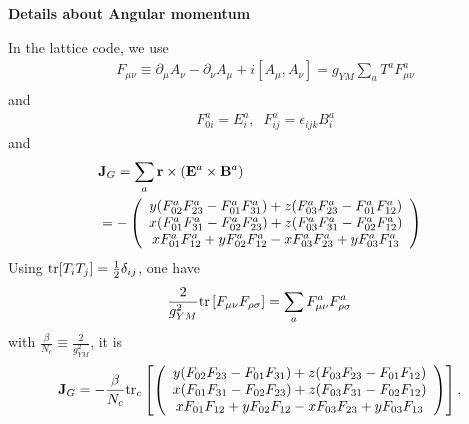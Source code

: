 \textbf{Details about Angular momentum}

In the lattice code, we use
\begin{equation}
\begin{split}
&F_{\mu\nu}\equiv \partial _{\mu}A_{\nu}-\partial _{\nu}A_{\mu}+i[A_{\mu},A_{\nu}]=g_{YM}\sum _aT^a F^a_{\mu\nu}\\
\end{split}
\end{equation}
and
\begin{equation}
\begin{split}
&F^a_{0i}=E^a_i,\;\;F^a_{ij}=\epsilon _{ijk}B^a_i
\end{split}
\end{equation}
and
\begin{equation}
\begin{split}
&{\bf J}_G=\sum _a {\bf r}\times \left({\bf E}^a\times {\bf B}^a\right)\\
&=-\left(\begin{array}{c}
y(F^a_{02}F^a_{23}-F^a_{01}F^a_{31})+z(F^a_{03}F^a_{23}-F^a_{01}F^a_{12})\\
x(F^a_{01}F^a_{31}-F^a_{02}F^a_{23})+z(F^a_{03}F^a_{31}-F^a_{02}F^a_{12})\\
x F^a_{01}F^a_{12}+yF^a_{02}F^a_{12}-xF^a_{03}F^a_{23}+yF^a_{03}F^a_{13} \end{array}\right)\\
\end{split}
\end{equation}
Using ${\rm tr}[T_iT_j]=\frac{1}{2}\delta _{ij}$, one have
\begin{equation}
\begin{split}
&\frac{2}{g_{YM}^2}{\rm tr}\left[F_{\mu\nu}F_{\rho\sigma}\right]=\sum _a F^a_{\mu\nu}F^a_{\rho\sigma}\\
\end{split}
\end{equation}
with $\frac{\beta}{N_c} \equiv \frac{2}{g_{YM}^2}$, it is
\begin{equation}
\begin{split}
&{\bf J}_G=-\frac{\beta}{N_c}{\rm tr}_c\left[\left(\begin{array}{c}
y(F_{02}F_{23}-F_{01}F_{31})+z(F_{03}F_{23}-F_{01}F_{12})\\
x(F_{01}F_{31}-F_{02}F_{23})+z(F_{03}F_{31}-F_{02}F_{12})\\
x F_{01}F_{12}+yF_{02}F_{12}-xF_{03}F_{23}+yF_{03}F_{13} \end{array}\right)\right],\\
\end{split}
\end{equation}

